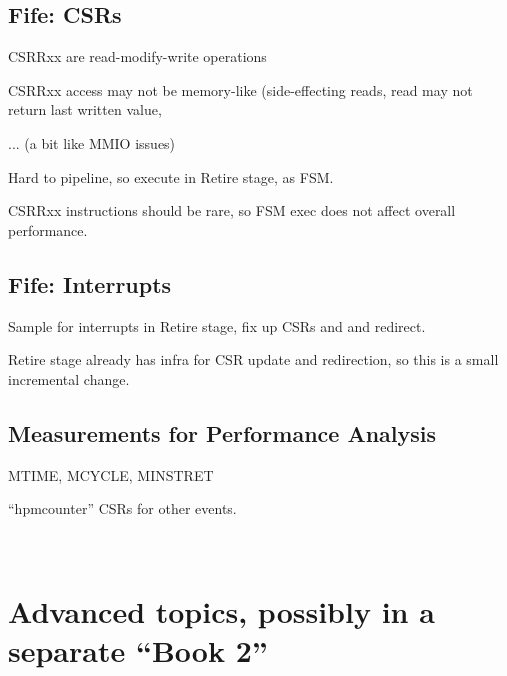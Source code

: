 
\subsection{Fife: CSRs}

\begin{tightlist}
\item CSRRxx are read-modify-write operations
\item CSRRxx access may not be memory-like (side-effecting reads, read
      may not return last written value,
\item ... (a bit like MMIO issues)
\end{tightlist}
Hard to pipeline, so execute in Retire stage, as FSM.

CSRRxx instructions should be rare, so FSM exec does not affect overall performance.


\subsection{Fife: Interrupts}

Sample for interrupts in Retire stage, fix up CSRs and and redirect.

Retire stage already has infra for CSR update and redirection, so this
is a small incremental change.


\subsection{Measurements for Performance Analysis}

MTIME, MCYCLE, MINSTRET

``hpmcounter'' CSRs for other events.

\hdivider \\
\hdivider


\section{Advanced topics, possibly in a separate ``Book 2''}


